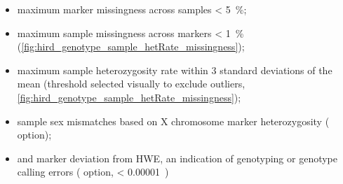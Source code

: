 \begin{itemize}
    \item maximum marker missingness across samples \SI{< 5}{\percent};
    \item maximum sample missingness across markers \SI{< 1}{\percent} (\cref{fig:hird_genotype_sample_hetRate_missingness});
    \item maximum sample heterozygosity rate within 3 standard deviations of the mean (threshold selected visually to exclude outliers, \cref{fig:hird_genotype_sample_hetRate_missingness});
    \item sample sex mismatches based on X chromosome marker heterozygosity ( option);
    \item and marker deviation from \gls{HWE}, an indication of genotyping or genotype calling errors \autocite{mccarthy2008GenomewideAssociationStudies,anderson2010DataQualityControl} ( option, \pvalue{} \SI[scientific-notation=true]{< 0.00001})%

\end{itemize}
